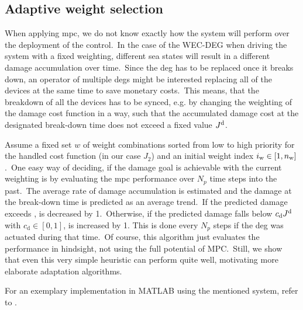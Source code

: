 \subsection{Adaptive weight selection}
When applying \ac{mpc}, we do not know exactly how the system will perform over the deployment of the control.\ 
In the case of the WEC-DEG when driving the system with a fixed weighting, different sea states will result in a different damage accumulation over time.\ 
Since the \ac{deg} has to be replaced once it breaks down, an operator of multiple \acp{deg} might be interested replacing all of the devices at the same time to save monetary costs.\ 
This means, that the breakdown of all the devices has to be synced, e.g. by changing the weighting of the damage cost function in a way, such that the accumulated damage cost at the designated break-down time \tbd does not exceed a fixed value $J^\mathrm{d}$.\ 

Assume a fixed set $w$ of \nw weight combinations sorted from low to high priority for the handled cost function (in our case $J_2$) and an initial weight index $i_\mathrm{w} \in [1, n_\mathrm{w}]$.\ 
One easy way of deciding, if the damage goal is achievable with the current weighting is by evaluating the \ac{mpc} performance over $N_p$ time steps into the past.\ 
The average rate of damage accumulation \Jps is estimated and the damage at the break-down time is predicted as an average trend.\
If the predicted damage exceeds \Jd, \iw is decreased by 1.\ 
Otherwise, if the predicted damage falls below $c_\mathrm{d}J^\mathrm{d}$ with $c_\mathrm{d}\in\left[0, 1\right]$, \iw is increased by 1.
This is done every $N_p$ steps if the \ac{deg} was actuated during that time.\
Of course, this algorithm just evaluates the performance in hindsight, not using the full potential of MPC.\ 
Still, we show that even this very simple heuristic can perform quite well, motivating more elaborate adaptation algorithms.
%

For an exemplary implementation in MATLAB using the mentioned system, refer to .
